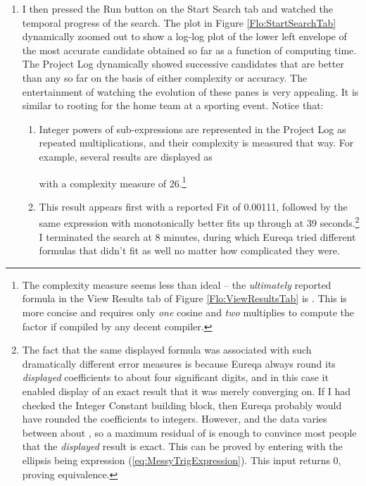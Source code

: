 \documentclass[12pt,english]{article}
\begin{document}
\begin{enumerate}
\begin{enumerate}
\end{enumerate}
\item I then pressed the \textsf{Run} button on the \textsf{Start Search}
tab and watched the temporal progress of the search. The plot in Figure
\ref{Flo:StartSearchTab} dynamically zoomed out to show a log-log
plot of the lower left envelope of the most accurate candidate obtained
so far as a function of computing time. The \textsf{Project Log} dynamically
showed successive candidates that are better than any so far on the
basis of either complexity or accuracy. The entertainment of watching
the evolution of these panes is very appealing. It is similar to rooting
for the home team at a sporting event. Notice that:\vspace{-5pt}


\begin{enumerate}
\item Integer powers of sub-expressions are represented in the Project Log
as repeated multiplications, and their complexity is measured that
way. For example, several results are displayed as\vspace{-5pt}

with a complexity measure of 26.\footnote{The complexity measure seems less than ideal -- the \textsl{ultimately}
reported formula in the \textsf{View Results} tab of Figure \ref{Flo:ViewResultsTab}
is . This is more concise and requires only
\textsl{one} cosine and \textsl{two} multiplies to compute the 
factor if compiled by any decent compiler. }\vspace{-3pt}

\item This result appears first with a reported \textsf{Fit} of 0.00111,
followed by the same expression with monotonically better fits up
through  at 39 seconds.\footnote{The fact that the same displayed formula was associated with such
dramatically different error measures is because Eureqa always round
its \textsl{displayed} coefficients to about four significant digits,
and in this case it enabled display of an exact result that it was
merely converging on. If I had checked the \textsf{Integer Constant}
building block, then Eureqa probably would have rounded the coefficients
to integers. However,  and the data varies between about
, so a maximum residual of  is enough
to convince most people that the \textsl{displayed} result is exact.
This can be proved by entering
with the ellipsis being expression (\ref{eq:MessyTrigExpression}).
This input returns 0, proving equivalence.} I terminated the search at 8 minutes, during which Eureqa tried different
formulas that didn't fit as well no matter how complicated they were.\vspace{-5pt}


\end{enumerate}
\end{enumerate}
\end{document}
